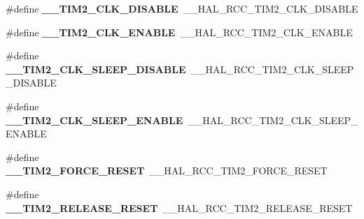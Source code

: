 \begin{DoxyCompactItemize}
\item 
\#define {\bfseries \+\_\+\+\_\+\+T\+I\+M2\+\_\+\+C\+L\+K\+\_\+\+D\+I\+S\+A\+B\+LE}~\+\_\+\+\_\+\+H\+A\+L\+\_\+\+R\+C\+C\+\_\+\+T\+I\+M2\+\_\+\+C\+L\+K\+\_\+\+D\+I\+S\+A\+B\+LE\hypertarget{group___h_a_l___r_c_c___aliased_ga44d19f521b4c0161d7fb28c96bf5fbb7}{}\label{group___h_a_l___r_c_c___aliased_ga44d19f521b4c0161d7fb28c96bf5fbb7}

\item 
\#define {\bfseries \+\_\+\+\_\+\+T\+I\+M2\+\_\+\+C\+L\+K\+\_\+\+E\+N\+A\+B\+LE}~\+\_\+\+\_\+\+H\+A\+L\+\_\+\+R\+C\+C\+\_\+\+T\+I\+M2\+\_\+\+C\+L\+K\+\_\+\+E\+N\+A\+B\+LE\hypertarget{group___h_a_l___r_c_c___aliased_gae06cbd87c2db5dbb2aee0d47888374af}{}\label{group___h_a_l___r_c_c___aliased_gae06cbd87c2db5dbb2aee0d47888374af}

\item 
\#define {\bfseries \+\_\+\+\_\+\+T\+I\+M2\+\_\+\+C\+L\+K\+\_\+\+S\+L\+E\+E\+P\+\_\+\+D\+I\+S\+A\+B\+LE}~\+\_\+\+\_\+\+H\+A\+L\+\_\+\+R\+C\+C\+\_\+\+T\+I\+M2\+\_\+\+C\+L\+K\+\_\+\+S\+L\+E\+E\+P\+\_\+\+D\+I\+S\+A\+B\+LE\hypertarget{group___h_a_l___r_c_c___aliased_ga6f8e4c63d5473a6af21a776fb1c20d1d}{}\label{group___h_a_l___r_c_c___aliased_ga6f8e4c63d5473a6af21a776fb1c20d1d}

\item 
\#define {\bfseries \+\_\+\+\_\+\+T\+I\+M2\+\_\+\+C\+L\+K\+\_\+\+S\+L\+E\+E\+P\+\_\+\+E\+N\+A\+B\+LE}~\+\_\+\+\_\+\+H\+A\+L\+\_\+\+R\+C\+C\+\_\+\+T\+I\+M2\+\_\+\+C\+L\+K\+\_\+\+S\+L\+E\+E\+P\+\_\+\+E\+N\+A\+B\+LE\hypertarget{group___h_a_l___r_c_c___aliased_gaad6d1c9176e1ca4c3eb67bfbd1d3be57}{}\label{group___h_a_l___r_c_c___aliased_gaad6d1c9176e1ca4c3eb67bfbd1d3be57}

\item 
\#define {\bfseries \+\_\+\+\_\+\+T\+I\+M2\+\_\+\+F\+O\+R\+C\+E\+\_\+\+R\+E\+S\+ET}~\+\_\+\+\_\+\+H\+A\+L\+\_\+\+R\+C\+C\+\_\+\+T\+I\+M2\+\_\+\+F\+O\+R\+C\+E\+\_\+\+R\+E\+S\+ET\hypertarget{group___h_a_l___r_c_c___aliased_ga436568ac94926e275ddcb03dc505af7d}{}\label{group___h_a_l___r_c_c___aliased_ga436568ac94926e275ddcb03dc505af7d}

\item 
\#define {\bfseries \+\_\+\+\_\+\+T\+I\+M2\+\_\+\+R\+E\+L\+E\+A\+S\+E\+\_\+\+R\+E\+S\+ET}~\+\_\+\+\_\+\+H\+A\+L\+\_\+\+R\+C\+C\+\_\+\+T\+I\+M2\+\_\+\+R\+E\+L\+E\+A\+S\+E\+\_\+\+R\+E\+S\+ET\hypertarget{group___h_a_l___r_c_c___aliased_ga1e9358e947f8948c6a07915a5d291ca5}{}\label{group___h_a_l___r_c_c___aliased_ga1e9358e947f8948c6a07915a5d291ca5}


\end{DoxyCompactItemize}
